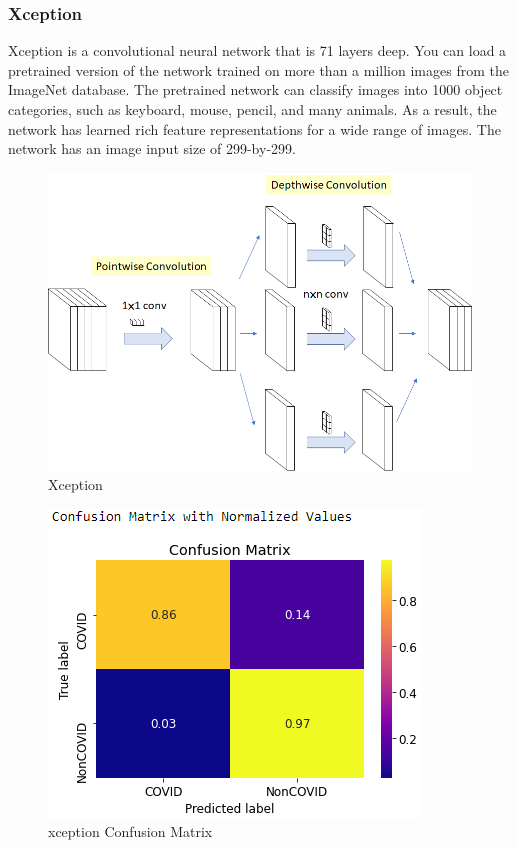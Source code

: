 \documentclass[a4paper,12pt]{report}
\begin{document}
  \subsubsection{Xception}
Xception is a convolutional neural network that is 71 layers deep. You can load a pretrained version of the network trained on more than a million images from the ImageNet database. The pretrained network can classify images into 1000 object categories, such as keyboard, mouse, pencil, and many animals. As a result, the network has learned rich feature representations for a wide range of images. The network has an image input size of 299-by-299.
\begin{figure}[h] %
   \begin{center}
   \includegraphics[scale=0.4]{xception.png}
   \caption{Xception}
  \end{center}
  \end{figure}
  \begin{figure}[h] %
   \begin{center}
   \includegraphics[scale=0.8]{xception_chest_cm.png}
   \caption{xception Confusion Matrix}
  \end{center}
  \end{figure}
\end{document}
